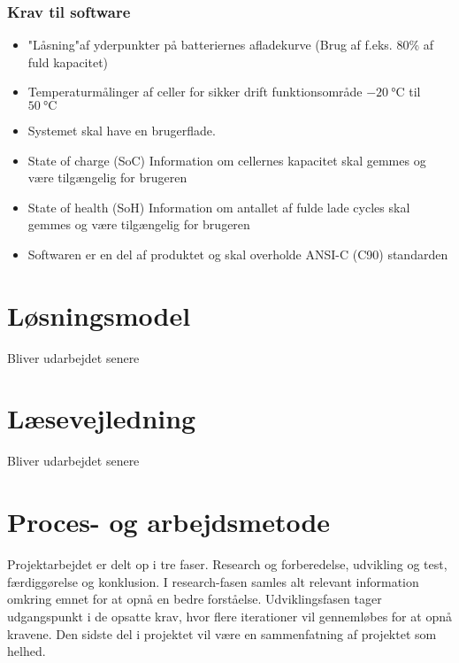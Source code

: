 \subsubsection{Krav til software}
\begin{itemize}[noitemsep]
	\item "Låsning"\space af yderpunkter på batteriernes afladekurve (Brug af f.eks. 80\% af fuld kapacitet)
	\item Temperaturmålinger af celler for sikker drift \textemdash \space funktionsområde $\SI{-20}{\celsius}$ til $\SI{50}{\celsius}$
	\item Systemet skal have en brugerflade.
	\item State of charge (SoC) \textemdash \space Information om cellernes kapacitet skal gemmes og være tilgængelig for brugeren
	\item State of health (SoH) \textemdash \space Information om antallet af fulde lade cycles skal gemmes og være tilgængelig for brugeren
	\item Softwaren er en del af produktet og skal overholde ANSI-C (C90) standarden
\end{itemize}


\section{Løsningsmodel}
Bliver udarbejdet senere

\section{Læsevejledning}
Bliver udarbejdet senere

\section{Proces- og arbejdsmetode}
Projektarbejdet er delt op i tre faser. Research og forberedelse, udvikling og test, færdiggørelse og konklusion. I research-fasen samles alt relevant information omkring emnet for at opnå en bedre forståelse. Udviklingsfasen tager udgangspunkt i de opsatte krav, hvor flere iterationer vil gennemløbes for at opnå kravene. Den sidste del i projektet vil være en sammenfatning af projektet som helhed.




